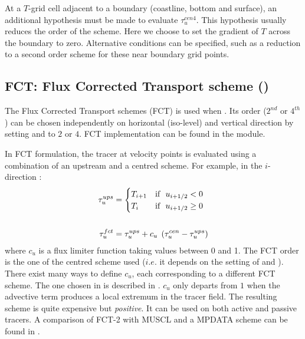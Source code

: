 \documentclass[../tex_main/NEMO_manual]{subfiles}
\begin{document}
At a $T$-grid cell adjacent to a boundary (coastline, bottom and surface),
an additional hypothesis must be made to evaluate $\tau _u^{cen4}$.
This hypothesis usually reduces the order of the scheme.
Here we choose to set the gradient of $T$ across the boundary to zero.
Alternative conditions can be specified, such as a reduction to a second order scheme for
these near boundary grid points.

\subsection{FCT: Flux Corrected Transport scheme (\protect{})}
\label{subsec:TRA_adv_tvd}

The Flux Corrected Transport schemes (FCT) is used when .
Its order ($2^{nd}$ or $4^{th}$) can be chosen independently on horizontal (iso-level) and vertical direction by
setting  and  to $2$ or $4$.
FCT implementation can be found in the  module.

In FCT formulation, the tracer at velocity points is evaluated using a combination of an upstream and
a centred scheme.
For example, in the $i$-direction :
\begin{equation} \label{eq:tra_adv_fct}
\begin{split}
\tau _u^{ups}&= \begin{cases}
 					T_{i+1} 	& \text{if $\ u_{i+1/2} <     0$} \hfill \\
 					T_i   		& \text{if $\ u_{i+1/2} \geq 0$} \hfill \\
				  \end{cases}     \\
\\
\tau _u^{fct}&=\tau _u^{ups} +c_u \;\left( {\tau _u^{cen} -\tau _u^{ups} } \right)
\end{split}
\end{equation}
where $c_u$ is a flux limiter function taking values between 0 and 1.
The FCT order is the one of the centred scheme used
($i.e.$ it depends on the setting of  and ).
There exist many ways to define $c_u$, each corresponding to a different FCT scheme.
The one chosen in \NEMO is described in \citet{Zalesak_JCP79}.
$c_u$ only departs from $1$ when the advective term produces a local extremum in the tracer field.
The resulting scheme is quite expensive but \emph{positive}.
It can be used on both active and passive tracers.
A comparison of FCT-2 with MUSCL and a MPDATA scheme can be found in \citet{Levy_al_GRL01}.
\end{document}

